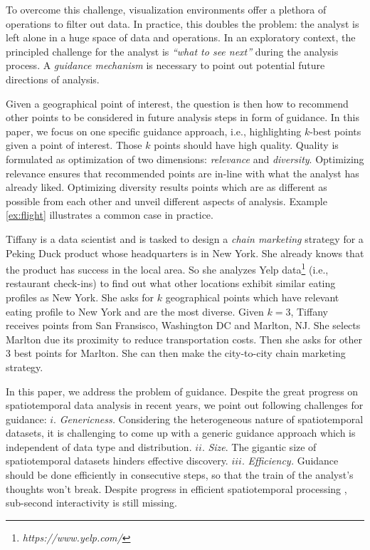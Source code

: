 To overcome this challenge, visualization environments offer a plethora of operations to filter out data. In practice, this doubles the problem: the analyst is left alone in a huge space of data and operations. 
In an exploratory context,
the principled challenge for the analyst is {\em ``what to see next''} during the analysis process. A {\em guidance mechanism} is necessary to point out potential future directions of analysis.

Given a geographical point of interest, the question is then how to recommend other points to be considered in future analysis steps in form of guidance. In this paper, we focus on one specific guidance approach, i.e., highlighting $k$-best points given a point of interest. Those $k$ points should have high quality. Quality is formulated as optimization of two dimensions: {\em relevance} and {\em diversity}. Optimizing relevance ensures that recommended points are in-line with what the analyst has already liked. Optimizing diversity results points which are as different as possible from each other and unveil different aspects of analysis. Example \ref{ex:flight} illustrates a common case in practice.

\begin{example}
\label{ex:flight}
Tiffany is a data scientist and is tasked to design a {\em chain marketing} strategy for a Peking Duck product whose headquarters is in New York. She already knows that the product has success in the local area. So she analyzes Yelp data\footnote{\it https://www.yelp.com/} (i.e., restaurant check-ins) to find out what other locations exhibit similar eating profiles as New York. She asks for $k$ geographical points which have relevant eating profile to New York and are the most diverse. Given $k=3$, Tiffany receives points from San Fransisco, Washington DC and Marlton, NJ. She selects Marlton due its proximity to reduce transportation costs. Then she asks for other 3 best points for Marlton. She can then make the city-to-city chain marketing strategy.
\end{example}

In this paper, we address the problem of guidance. Despite the great progress on spatiotemporal data analysis in recent years, we point out following challenges for guidance:
$i.$ {\em Genericness.} Considering the heterogeneous nature of spatiotemporal datasets, it is challenging to come up with a generic guidance approach which is independent of data type and distribution.
$ii.$ {\em Size}. The gigantic size of spatiotemporal datasets hinders effective discovery. 
$iii.$ {\em Efficiency.} Guidance should be done efficiently in consecutive steps, so that the train of the analyst's thoughts won't break. Despite progress in efficient spatiotemporal processing \cite{yu2015geospark}, sub-second interactivity is still missing.

